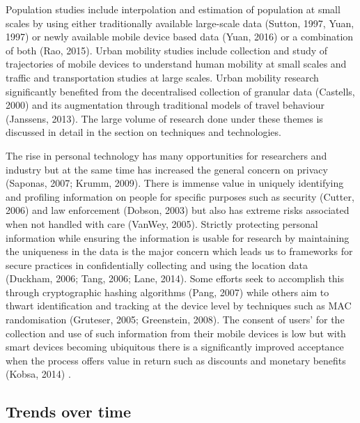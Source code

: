 Population studies include interpolation and estimation of population at small scales by using either traditionally available large-scale data (Sutton, 1997, Yuan, 1997) or newly available mobile device based data (Yuan, 2016) or a combination of both (Rao, 2015).
Urban mobility studies include collection and study of trajectories of mobile devices to understand human mobility at small scales and traffic and transportation studies at large scales.
Urban mobility research significantly benefited from the decentralised collection of granular data (Castells, 2000) and its augmentation through traditional models of travel behaviour (Janssens, 2013).
The large volume of research done under these themes is discussed in detail in the section on techniques and technologies.

The rise in personal technology has many opportunities for researchers and industry but at the same time has increased the general concern on privacy (Saponas, 2007; Krumm, 2009).
There is immense value in uniquely identifying and profiling information on people for specific purposes such as security (Cutter, 2006) and law enforcement (Dobson, 2003) but also has extreme risks associated when not handled with care (VanWey, 2005).
Strictly protecting personal information while ensuring the information is usable for research by maintaining the uniqueness in the data is the major concern which leads us to frameworks for secure practices in confidentially collecting and using the location data (Duckham, 2006; Tang, 2006; Lane, 2014).
Some efforts seek to accomplish this through cryptographic hashing algorithms (Pang, 2007) while others aim to thwart identification and tracking at the device level by techniques such as MAC randomisation (Gruteser, 2005; Greenstein, 2008).
The consent of users’ for the collection and use of such information from their mobile devices is low but with smart devices becoming ubiquitous there is a significantly improved acceptance when the process offers value in return such as discounts and monetary benefits (Kobsa, 2014) .

\subsection{Trends over time}

